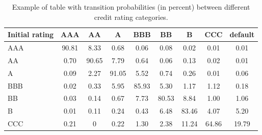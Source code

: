 \begin{table}[htb]
	\centering
	\begin{tabular}{|l|c|c|c|c|c|c|c|c|}
	\hline
	Initial rating & AAA & AA & A & BBB & BB & B & CCC & default \\
	\hline
	\hline
	AAA & 90.81 & 8.33 & 0.68 & 0.06 & 0.08 & 0.02 & 0.01& 0.01 \\ 
	\hline
	AA & 0.70 & 90.65 & 7.79 & 0.64 & 0.06 & 0.13 & 0.02 & 0.01 \\ 
	\hline
	A & 0.09 & 2.27 & 91.05 & 5.52 & 0.74 & 0.26 & 0.01 & 0.06 \\ 
	\hline
	BBB & 0.02 & 0.33 & 5.95 & 85.93 & 5.30 & 1.17 & 1.12 & 0.18 \\
	\hline
	BB & 0.03 & 0.14 & 0.67 & 7.73 & 80.53 & 8.84 & 1.00 & 1.06 \\
	\hline
	B & 0.01 & 0.11 & 0.24 & 0.43 & 6.48 & 83.46 & 4.07 & 5.20 \\
	\hline
	CCC & 0.21 & 0 & 0.22 & 1.30 & 2.38 & 11.24 & 64.86 & 19.79 \\		
	\hline
\end{tabular}
\caption{Example of table with transition probabilities (in percent) between different credit rating categories.}
\label{tab:credit_ratings}
\end{table}

